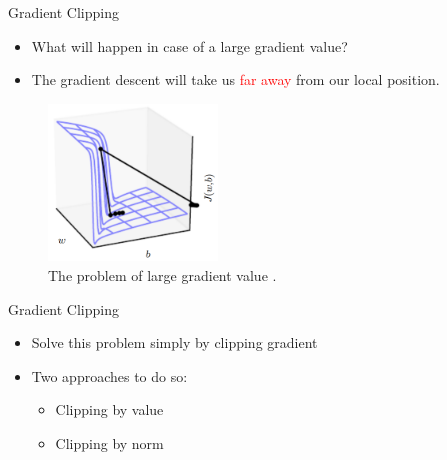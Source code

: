 \begin{frame}{Gradient Clipping}
    \begin{itemize}
        \item What will happen in case of a large gradient value?
        \pause
        \item The gradient descent will take us \textcolor{red}{far away} from our local position.
    \end{itemize}
	\begin{figure}[H]
		\centering
		\includegraphics[width=0.4\textwidth]{Images/gard-clipping-1.png}
		\caption{The problem of large gradient value \cite{Goodfellow-et-al-2016}.}
	\end{figure}
\end{frame}

\begin{frame}{Gradient Clipping}
	\begin{itemize}
		\item Solve this problem simply by clipping gradient
		\item Two approaches to do so:
		\begin{itemize}
			\item Clipping by value
			\item Clipping by norm
		\end{itemize} 
	\end{itemize}
\end{frame}

